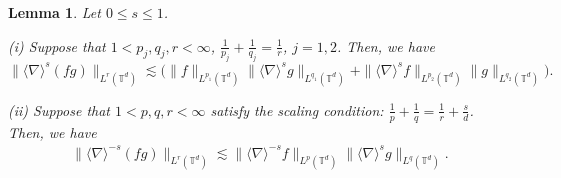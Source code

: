 \documentclass[letterpaper, 11pt,  reqno]{amsart}
\newtheorem{lemma}[theorem]{Lemma}
\newcommand{\1}{\hspace{0.5mm}\text{I}\hspace{0.5mm}}
\newcommand{\noi}{\noindent}
\newcommand{\T}{\mathbb{T}}
\newcommand{\nb}{\nabla}
\newcommand{\les}{\lesssim}
\newcommand{\jb}[1]
{\langle #1 \rangle}
\numberwithin{equation}{section}
\numberwithin{theorem}{section}
\begin{document}
\begin{lemma}\label{LEM:bilin}
 Let $0\le s \le 1$.

\smallskip

\noi
\textup{(i)} Suppose that 
 $1<p_j,q_j,r < \infty$, $\frac1{p_j} + \frac1{q_j}= \frac1r$, $j = 1, 2$. 
 Then, we have  
\begin{equation}  
\| \jb{\nb}^s (fg) \|_{L^r(\T^d)} 
\les \Big( \| f \|_{L^{p_1}(\T^d)} 
\| \jb{\nb}^s g \|_{L^{q_1}(\T^d)} + \| \jb{\nb}^s f \|_{L^{p_2}(\T^d)} 
\|  g \|_{L^{q_2}(\T^d)}\Big).
\label{bilinear5}
\end{equation}  


\smallskip

\noi
\textup{(ii)} 
Suppose that  
 $1<p,q,r < \infty$ satisfy the scaling condition:
$\frac1p+\frac1q=\frac1r + \frac{s}d $.
Then, we have
\begin{align}
\big\| \jb{\nb}^{-s} (fg) \big\|_{L^r(\T^d)} \les \big\| \jb{\nb}^{-s} f \big\|_{L^p(\T^d) } 
\big\| \jb{\nb}^s g \big\|_{L^q(\T^d)}.  
\label{bilinear2}
\end{align}


\end{lemma} 
\end{document}
